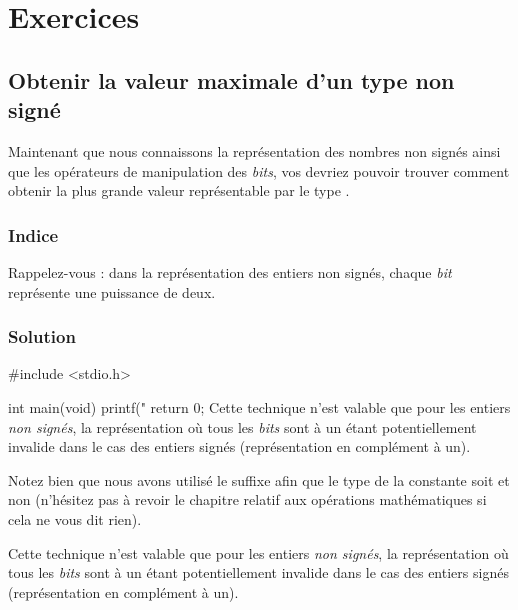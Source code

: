 \section{Exercices}
\label{exercices-6}

\subsection{Obtenir la valeur maximale d'un type non signé}
\label{obtenir-la-valeur-maximale-dun-type-non-signe}

Maintenant que nous connaissons la représentation des nombres non signés
ainsi que les opérateurs de manipulation des \emph{bits}, vos devriez
pouvoir trouver comment obtenir la plus grande valeur représentable par
le type .

\subsubsection{Indice}
\label{indice-6}

\begin{secretbox}
Rappelez-vous : dans la représentation des entiers non signés, chaque 
\emph{bit} représente une puissance de deux.
\end{secretbox}


\subsubsection{Solution}
\label{solution-1}

\begin{C}
#include <stdio.h>


int main(void)
{
    printf("%
    return 0;
}Cette technique n'est valable que pour les entiers
\emph{non signés}, la représentation où tous les \emph{bits} sont à un
étant potentiellement invalide dans le cas des entiers signés
(représentation en complément à un).
\end{C}

\begin{attentionbox} 
 Notez bien que nous avons utilisé le suffixe  afin que le type de la
constante  soit  et non 
(n'hésitez pas à revoir le chapitre relatif aux opérations mathématiques
si cela ne vous dit rien).
\end{attentionbox}

\begin{erreurbox}
 Cette technique n'est valable que pour les entiers
\emph{non signés}, la représentation où tous les \emph{bits} sont à un
étant potentiellement invalide dans le cas des entiers signés
(représentation en complément à un).
\end{erreurbox}

